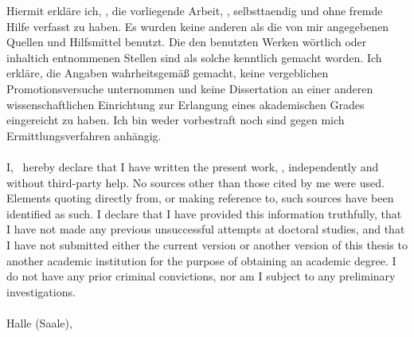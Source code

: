 
Hiermit erkläre ich, \thesisAuthor, die vorliegende Arbeit, \thesisTitle,
selbsttaendig und ohne fremde Hilfe verfasst zu haben.
Es wurden keine anderen als die von mir angegebenen Quellen und Hilfsmittel
benutzt. Die den benutzten Werken wörtlich oder inhaltich entnommenen
Stellen sind als solche kenntlich gemacht worden. Ich erkläre, die Angaben
wahrheitsgemäß gemacht, keine vergeblichen Promotionsversuche unternommen
und keine Dissertation an einer anderen wissenschaftlichen Einrichtung
zur Erlangung eines akademischen Grades eingereicht zu haben. Ich bin
weder vorbestraft noch sind gegen mich Ermittlungsverfahren anhängig.
\\
\\
I, \thesisAuthor\ hereby declare that I have written the present work,
\thesisTitle, independently and without third-party
help. No sources other than those cited by me were used. Elements quoting
directly from, or making reference to, such sources have been identified as
such. I declare that I have provided this information truthfully, that I have
not made any previous unsuccessful attempts at doctoral studies, and that I
have not submitted either the current version or another version of this thesis
to another academic institution for the purpose of obtaining an academic
degree. I do not have any prior criminal convictions, nor am I subject to any
preliminary investigations. \\
\vspace{1cm}\\
Halle (Saale),     \hspace{3cm}     \thesisDateOralExam\      \hspace{2cm}          \thesisAuthor